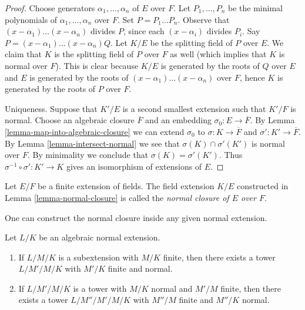 \begin{proof}
Choose generators $\alpha_1, \ldots, \alpha_n$ of $E$ over $F$.
Let $P_1, \ldots, P_n$ be the minimal polynomials of
$\alpha_1, \ldots, \alpha_n$ over $F$. Set $P = P_1 \ldots P_n$.
Observe that $(x - \alpha_1) \ldots (x - \alpha_n)$ divides $P$, since
each $(x - \alpha_i)$ divides $P_i$. Say
$P = (x - \alpha_1) \ldots (x - \alpha_n)Q$.
Let $K/E$ be the splitting field of $P$ over $E$.
We claim that $K$ is the splitting field of $P$ over $F$ as well
(which implies that $K$ is normal over $F$).
This is clear because $K/E$ is generated by the roots of
$Q$ over $E$ and $E$ is generated by the roots of
$(x - \alpha_1) \ldots (x - \alpha_n)$ over $F$, hence
$K$ is generated by the roots of $P$ over $F$.

\medskip\noindent
Uniqueness. Suppose that $K'/E$ is a second smallest extension such that
$K'/F$ is normal. Choose an algebraic closure $\overline{F}$ and an
embedding $\sigma_0 : E \to \overline{F}$. By
Lemma \ref{lemma-map-into-algebraic-closure}
we can extend $\sigma_0$ to $\sigma : K \to \overline{F}$ and
$\sigma' : K' \to \overline{F}$.
By Lemma \ref{lemma-intersect-normal} we see that
$\sigma(K) \cap \sigma'(K')$ is normal over $F$.
By minimality we conclude that $\sigma(K) = \sigma'(K')$.
Thus $\sigma^{-1} \circ \sigma' : K' \to K$ gives an isomorphism
of extensions of $E$.
\end{proof}

\begin{definition}
\label{definition-normal-closure}
Let $E/F$ be a finite extension of fields. The field extension $K/E$
constructed in Lemma \ref{lemma-normal-closure}
is called the {\it normal closure of $E$ over $F$}.
\end{definition}

\noindent
One can construct the normal closure inside any given normal extension.

\begin{lemma}
\label{lemma-normal-closure-inside-normal}
Let $L/K$ be an algebraic normal extension.
\begin{enumerate}
\item If $L/M/K$ is a subextension with $M/K$ finite, then there exists
a tower $L/M'/M/K$ with $M'/K$ finite and normal.
\item If $L/M'/M/K$ is a tower with $M/K$ normal and $M'/M$ finite,
then there exists a tower $L/M''/M'/M/K$ with $M''/M$
finite and $M''/K$ normal.
\end{enumerate}
\end{lemma}


